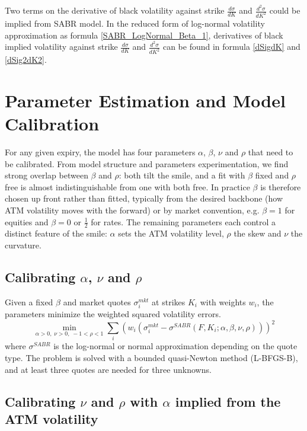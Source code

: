 \documentclass{article}
\begin{document}
Two terms on the derivative of black volatility against strike $ \frac{d \sigma}{d K} $ and $ \frac{d^2 \sigma}{d K^2} $ could be implied from SABR model.
In the reduced form of log-normal volatility approximation as formula \ref{SABR_LogNormal_Beta_1}, derivatives of black implied volatility against strike $ \frac{d \sigma}{d K} $ and $ \frac{d^2 \sigma}{d K^2} $ can be found in formula \ref{dSigdK} and \ref{dSig2dK2}.


\section{Parameter Estimation and Model Calibration}

For any given expiry, the model has four parameters $ \alpha $, $ \beta $, $ \nu $ and $ \rho $ that need to be calibrated.
From model structure and parameters experimentation, we find strong overlap between $ \beta $ and $ \rho $: both tilt the smile, and a fit with $ \beta $ fixed and $ \rho $ free is almost indistinguishable from one with both free.
In practice $ \beta $ is therefore chosen up front rather than fitted, typically from the desired backbone (how ATM volatility moves with the forward) or by market convention, e.g. $ \beta = 1 $ for equities and $ \beta = 0 $ or $ \frac{1}{2} $ for rates.
The remaining parameters each control a distinct feature of the smile: $ \alpha $ sets the ATM volatility level, $ \rho $ the skew and $ \nu $ the curvature.

\subsection{Calibrating $ \alpha $, $ \nu $ and $ \rho $}

Given a fixed $ \beta $ and market quotes $ \sigma_i^{mkt} $ at strikes $ K_i $ with weights $ w_i $, the parameters minimize the weighted squared volatility errors.
\begin{equation} \label{SABR calibration objective}
    \min_{\alpha > 0, \; \nu > 0, \; -1 < \rho < 1} \sum_{i} \left(w_i \left(\sigma_i^{mkt} - \sigma^{SABR}\left(F, K_i; \alpha, \beta, \nu, \rho\right)\right)\right)^2
\end{equation}
where $ \sigma^{SABR} $ is the log-normal or normal approximation depending on the quote type.
The problem is solved with a bounded quasi-Newton method (L-BFGS-B), and at least three quotes are needed for three unknowns.

\subsection{Calibrating $ \nu $ and $ \rho $ with $ \alpha $ implied from the ATM volatility}
\end{document}
